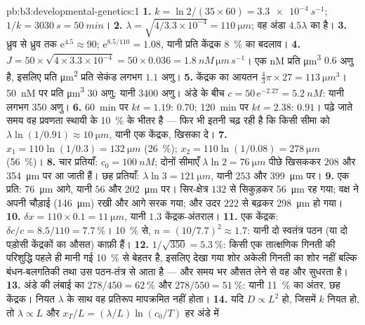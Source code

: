 \begin{solution}{pb:b3:developmental-genetics:1}
\textbf{1.} $k = \ln 2/(35\times 60) = \qty{3.3e-4}{s^{-1}}$; $1/k =
\qty{3030}{s} = \qty{50}{min}$।
\textbf{2.} $\lambda = \sqrt{4/3.3\times 10^{-4}} = \qty{110}{\micro m}$;
वह अंडा $4.5\lambda$ का है।
\textbf{3.} ध्रुव से ध्रुव तक $\mathrm{e}^{4.5} \approx 90$;
$\mathrm{e}^{8.5/110} = 1.08$, यानी प्रति केंद्रक \qty{8}{\%} का बदलाव।
\textbf{4.} $J = 50\times\sqrt{4\times 3.3\times 10^{-4}} = 50\times
0.036 = \qty{1.8}{nM\,\micro m\,s^{-1}}$। एक nM प्रति
\unit{\micro m^3} $0.6$ अणु है, इसलिए प्रति \unit{\micro m^2}
प्रति सेकंड लगभग $1.1$ अणु।
\textbf{5.} केंद्रक का आयतन $\tfrac{4}{3}\pi\times 27 = \qty{113}{\micro
m^3}$। \qty{50}{nM} पर प्रति \unit{\micro m^3} $30$ अणु:
यानी \num{3400} अणु। अंडे के बीच $c = 50\,\mathrm{e}^{-2.27} =
\qty{5.2}{nM}$: यानी लगभग \num{350} अणु।
\textbf{6.} \qty{60}{min} पर $kt = 1.19$: $0.70$; \qty{120}{min} पर
$kt = 2.38$: $0.91$। पढ़े जाते समय वह प्रवणता स्थायी के \qty{10}{\%}
के भीतर है --- फिर भी इतनी चढ़ रही है कि किसी सीमा को
$\lambda\ln(1/0.91) \approx \qty{10}{\micro m}$, यानी एक केंद्रक,
खिसका दे।
\textbf{7.} $x_{1} = 110\ln(1/0.3) = \qty{132}{\micro m}$
(\qty{26}{\%}); $x_{2} = 110\ln(1/0.08) = \qty{278}{\micro m}$
(\qty{56}{\%})।
\textbf{8.} चार प्रतियाँ: $c_{0} = \qty{100}{nM}$; दोनों सीमाएँ
$\lambda\ln 2 = \qty{76}{\micro m}$ पीछे खिसककर $208$ और
\qty{354}{\micro m} पर आ जाती हैं। छह प्रतियाँ: $\lambda\ln 3 = \qty{121}{\micro m}$,
यानी $253$ और \qty{399}{\micro m} पर।
\textbf{9.} एक प्रति: \qty{76}{\micro m} आगे, यानी $56$ और
\qty{202}{\micro m} पर। सिर-क्षेत्र $132$ से सिकुड़कर
\qty{56}{\micro m} रह गया; वक्ष ने अपनी चौड़ाई (\qty{146}{\micro m})
रखी और आगे सरक गया; और उदर $222$ से बढ़कर \qty{298}{\micro m} हो गया।
\textbf{10.} $\delta x = 110\times 0.1 = \qty{11}{\micro m}$, यानी $1.3$
केंद्रक-अंतराल।
\textbf{11.} एक केंद्रक: $\delta c/c = 8.5/110 = \qty{7.7}{\%}$।
\qty{10}{\%} से, $n = (10/7.7)^{2} \approx 1.7$: यानी दो स्वतंत्र पठन
(या दो पड़ोसी केंद्रकों का औसत) काफ़ी हैं।
\textbf{12.} $1/\sqrt{350} = \qty{5.3}{\%}$: किसी एक तात्क्षणिक गिनती
की परिशुद्धि पहले ही मानी गई \qty{10}{\%} से बेहतर है, इसलिए देखा गया
शोर अकेली गिनती का शोर नहीं बल्कि बंधन-बलगतिकी तथा उस पठन-तंत्र से आता
है --- और समय भर औसत लेने से वह और सुधरता है।
\textbf{13.} अंडे की लंबाई का $278/450 = \qty{62}{\%}$ और
$278/550 = \qty{51}{\%}$: यानी \qty{11}{\%} का अंतर, छह केंद्रक। नियत
$\lambda$ के साथ वह प्रतिरूप मापक्रमित नहीं होता।
\textbf{14.} यदि $D \propto L^{2}$ हो, जिसमें $k$ नियत हो, तो
$\lambda \propto L$ और $x_{T}/L = (\lambda/L)\ln(c_{0}/T)$ हर अंडे में

\end{solution}
